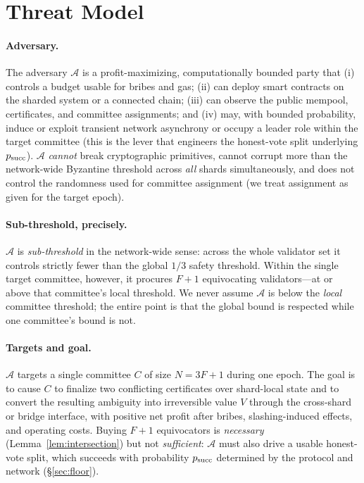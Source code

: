 \section{Threat Model}
\label{sec:threat}

\paragraph{Adversary.}
The adversary $\mathcal{A}$ is a profit-maximizing, computationally bounded party that (i) controls a
budget usable for bribes and gas; (ii) can deploy smart contracts on the sharded system or a
connected chain; (iii) can observe the public mempool, certificates, and committee assignments;
and (iv) may, with bounded probability, induce or exploit transient network asynchrony or occupy a
leader role within the target committee (this is the lever that engineers the honest-vote split
underlying $p_{\mathrm{succ}}$). $\mathcal{A}$ \emph{cannot} break cryptographic primitives, cannot corrupt
more than the network-wide Byzantine threshold across \emph{all} shards simultaneously, and does
not control the randomness used for committee assignment (we treat assignment as given for the
target epoch).

\paragraph{Sub-threshold, precisely.}
$\mathcal{A}$ is \emph{sub-threshold} in the network-wide sense: across the whole validator set it
controls strictly fewer than the global $1/3$ safety threshold. Within the single target committee,
however, it procures $F+1$ equivocating validators---at or above that committee's local threshold.
We never assume $\mathcal{A}$ is below the \emph{local} committee threshold; the entire point is that
the global bound is respected while one committee's bound is not.

\paragraph{Targets and goal.}
$\mathcal{A}$ targets a single committee $C$ of size $N=3F+1$ during one epoch. The goal is to cause
$C$ to finalize two conflicting certificates over shard-local state and to convert the resulting
ambiguity into irreversible value $V$ through the cross-shard or bridge interface, with positive net
profit after bribes, slashing-induced effects, and operating costs. Buying $F+1$ equivocators is
\emph{necessary} (Lemma~\ref{lem:intersection}) but not \emph{sufficient}: $\mathcal{A}$ must also
drive a usable honest-vote split, which succeeds with probability $p_{\mathrm{succ}}$ determined by the protocol
and network (\S\ref{sec:floor}).

